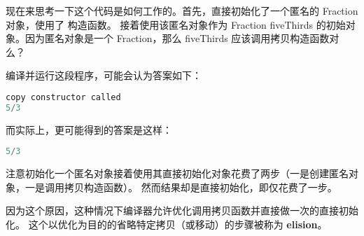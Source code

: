 \documentclass[../../LearnCpp.tex]{subfiles}
\begin{document}
现在来思考一下这个代码是如何工作的。首先，直接初始化了一个匿名的 Fraction 对象，使用了  构造函数。
接着使用该匿名对象作为 Fraction fiveThirds 的初始对象。因为匿名对象是一个 Fraction，那么 fiveThirds 应该调用拷贝构造函数对么？

编译并运行这段程序，可能会认为答案如下：

\begin{lstlisting}[language=C++]
copy constructor called
5/3
\end{lstlisting}

而实际上，更可能得到的答案是这样：

\begin{lstlisting}[language=C++]
5/3
\end{lstlisting}

注意初始化一个匿名对象接着使用其直接初始化对象花费了两步（一是创建匿名对象，一是调用拷贝构造函数）。
然而结果却是直接初始化，即仅花费了一步。

因为这个原因，这种情况下编译器允许优化调用拷贝函数并直接做一次的直接初始化。
这个以优化为目的的省略特定拷贝（或移动）的步骤被称为 \textbf{elision}。
\end{document}
